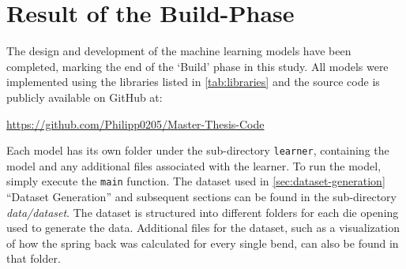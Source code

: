 \section{Result of the Build-Phase}\label{sec:results-build-phase}

The design and development of the machine learning models have been completed, marking the end of the `Build' phase
in this study.
All models were implemented using the libraries listed in \cref{tab:libraries} and the source
code is publicly available on GitHub at:

\url{https://github.com/Philipp0205/Master-Thesis-Code}

Each model has its own folder under the sub-directory \texttt{learner}, containing the model and any additional files
associated with the learner.
To run the model, simply execute the \texttt{main} function.
The dataset used in \cref{sec:dataset-generation} ``Dataset Generation'' and subsequent sections can be found in
the sub-directory \textit{data/dataset}.
The dataset is structured into different folders for each die opening used
to generate the data.
Additional files for the dataset, such as a visualization of how the spring back was calculated
for every single bend, can also be found in that folder.